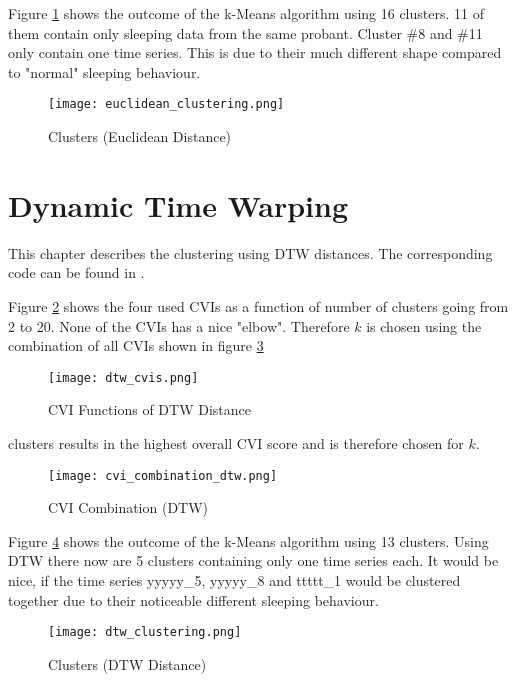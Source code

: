 \clearpage
Figure \ref{fig:euc_clusters} shows the outcome of the k-Means algorithm using 16 clusters. 11 of them contain only sleeping data from the same probant. Cluster \#8 and \#11 only contain one time series. This is due to their much different shape compared to "normal" sleeping behaviour.

\begin{figure}[h!]
	\texttt{[image: euclidean\_clustering.png]}
	\caption{Clusters (Euclidean Distance)}
	\label{fig:euc_clusters}
\end{figure}



\clearpage
\section{Dynamic Time Warping}

This chapter describes the clustering using DTW distances. The corresponding code can be found in .


Figure \ref{fig:cvi_dtw} shows the four used CVIs as a function of number of clusters going from 2 to 20. None of the CVIs has a nice "elbow". Therefore $k$ is chosen using the combination of all CVIs shown in figure \ref{fig:cvi_dtw_combo}

\begin{figure}[h!]
	\texttt{[image: dtw\_cvis.png]}
	\caption{CVI Functions of DTW Distance}
	\label{fig:cvi_dtw}
\end{figure}

 clusters results in the highest overall CVI score and is therefore chosen for $k$.

\begin{figure}[h!]
	\texttt{[image: cvi\_combination\_dtw.png]}
	\caption{CVI Combination (DTW)}
	\label{fig:cvi_dtw_combo}
\end{figure}


\clearpage
Figure \ref{fig:dtw_clusters} shows the outcome of the k-Means algorithm using 13 clusters.
Using DTW there now are 5 clusters containing only one time series each. It would be nice, if the time series yyyyy\_5, yyyyy\_8 and ttttt\_1 would be clustered together due to their noticeable different sleeping behaviour.

\begin{figure}[h!]
	\texttt{[image: dtw\_clustering.png]}
	\caption{Clusters (DTW Distance)}
	\label{fig:dtw_clusters}
\end{figure}

